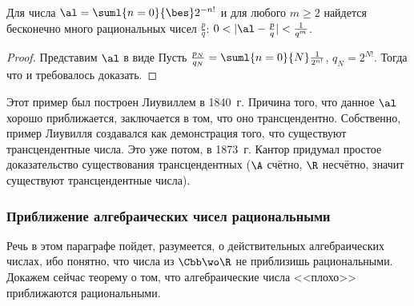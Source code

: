 \documentclass[a4paper]{article}
\begin{document}
\begin{stm}
Для числа $\al=\suml{n=0}{\bes}2^{-n!}$ и для любого $m\ge2$ найдется бесконечно много рациональных
чисел $\frac{p}{q}$: $0<|\al-\frac{p}q|<\frac1{q^m}$.
\end{stm}
\begin{proof}
Представим $\al$ в виде
Пусть $\frac{p_N}{q_N}=\suml{n=0}{N}\frac1{2^{n!}}$, $q_N=2^{N!}$. Тогда
что и требовалось доказать.
\end{proof}

\begin{petit}
Этот пример был построен Лиувиллем в 1840~г. Причина того, что данное $\al$ хорошо приближается, заключается в
том, что оно трансцендентно. Собственно, пример Лиувилля создавался как демонстрация того, что существуют
трансцендентные числа. Это уже потом, в 1873~г. Кантор придумал простое доказательство существования
трансцендентных ($\A$ счётно, $\R$ несчётно, значит существуют трансцендентные числа).
\end{petit}

\subsubsection{Приближение алгебраических чисел рациональными}

Речь в этом параграфе пойдет, разумеется, о действительных алгебраических числах, ибо понятно, что числа из
$\Cbb\wo\R$ не приблизишь рациональными. Докажем сейчас теорему о том, что
алгебраические числа <<плохо>> приближаются рациональными.
\end{document}
